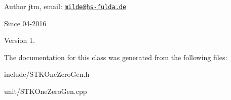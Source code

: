 \begin{DoxyAuthor}{Author}
jtm, email\+:  \href{mailto:milde@hs-fulda.de}{\tt milde@hs-\/fulda.\+de} 
\end{DoxyAuthor}
\begin{DoxySince}{Since}
04-\/2016 
\end{DoxySince}
\begin{DoxyVersion}{Version}
1. 
\end{DoxyVersion}


The documentation for this class was generated from the following files\+:\begin{DoxyCompactItemize}
\item 
include/S\+T\+K\+One\+Zero\+Gen.\+h\item 
unit/S\+T\+K\+One\+Zero\+Gen.\+cpp\end{DoxyCompactItemize}

